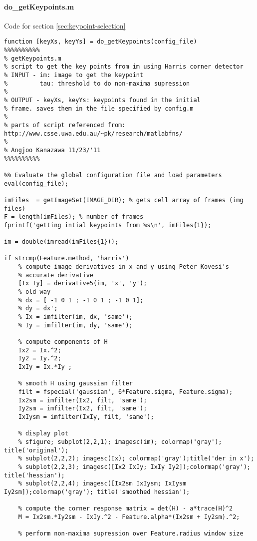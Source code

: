 \paragraph{do\_getKeypoints.m}
Code for section \ref{sec:keypoint-selection}
\begin{verbatim}
function [keyXs, keyYs] = do_getKeypoints(config_file)
%%%%%%%%%%
% getKeypoints.m
% script to get the key points from im using Harris corner detector
% INPUT - im: image to get the keypoint
%         tau: threshold to do non-maxima supression
%
% OUTPUT - keyXs, keyYs: keypoints found in the initial
% frame. saves them in the file specified by config.m
%
% parts of script referenced from: http://www.csse.uwa.edu.au/~pk/research/matlabfns/
%
% Angjoo Kanazawa 11/23/'11
%%%%%%%%%%

%% Evaluate the global configuration file and load parameters
eval(config_file);

imFiles  = getImageSet(IMAGE_DIR); % gets cell array of frames (img files)
F = length(imFiles); % number of frames
fprintf('getting intial keypoints from %s\n', imFiles{1});

im = double(imread(imFiles{1}));

if strcmp(Feature.method, 'harris')
    % compute image derivatives in x and y using Peter Kovesi's
    % accurate derivative
    [Ix Iy] = derivative5(im, 'x', 'y');
    % old way
    % dx = [ -1 0 1 ; -1 0 1 ; -1 0 1]; 
    % dy = dx';
    % Ix = imfilter(im, dx, 'same');
    % Iy = imfilter(im, dy, 'same');

    % compute components of H
    Ix2 = Ix.^2;
    Iy2 = Iy.^2;
    IxIy = Ix.*Iy ; 

    % smooth H using gaussian filter
    filt = fspecial('gaussian', 6*Feature.sigma, Feature.sigma);
    Ix2sm = imfilter(Ix2, filt, 'same');
    Iy2sm = imfilter(Ix2, filt, 'same');
    IxIysm = imfilter(IxIy, filt, 'same');

    % display plot
    % sfigure; subplot(2,2,1); imagesc(im); colormap('gray'); title('original');
    % subplot(2,2,2); imagesc(Ix); colormap('gray');title('der in x');
    % subplot(2,2,3); imagesc([Ix2 IxIy; IxIy Iy2]);colormap('gray'); title('hessian');
    % subplot(2,2,4); imagesc([Ix2sm IxIysm; IxIysm Iy2sm]);colormap('gray'); title('smoothed hessian');

    % compute the corner response matrix = det(H) - a*trace(H)^2
    M = Ix2sm.*Iy2sm - IxIy.^2 - Feature.alpha*(Ix2sm + Iy2sm).^2;

    % perform non-maxima supression over Feature.radius window size


\end{verbatim}
